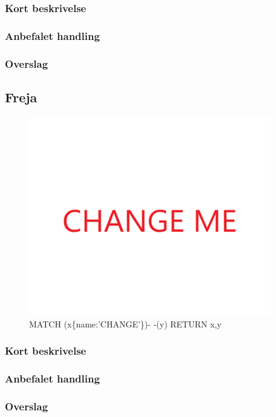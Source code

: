 \documentclass{article}
\begin{document}
\subsubsection{Kort beskrivelse}
\subsubsection{Anbefalet handling}
\subsubsection{Overslag}


\subsection{Freja}
\begin{figure}[h]
\includegraphics[width=300pt]{CHANGE.PNG}
\caption{MATCH (x\{name:'CHANGE'\})- -(y) RETURN x,y}
\end{figure}
\subsubsection{Kort beskrivelse}
\subsubsection{Anbefalet handling}
\subsubsection{Overslag}
\end{document}
